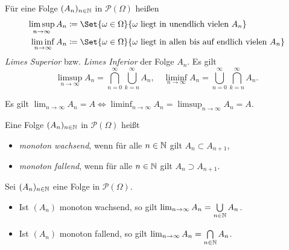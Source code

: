 \documentclass{cheat-sheet}
\newcommand{\PS}{\mathcal{P}} %
\newcommand{\PSO}{\PS(\Omega)} %
\begin{document}
\begin{defn}
  Für eine Folge $(A_n)_{n \in \mathbb{N}}$ in $\PS(\Omega)$ heißen
  \begin{align*}
    \limsup_{n \to \infty} A_n &\coloneqq \Set{ \omega \in \Omega }{ \omega \text{ liegt in unendlich vielen } A_n } \\
    \liminf_{n \to \infty} A_n &\coloneqq \Set{ \omega \in \Omega }{ \omega \text{ liegt in allen bis auf endlich vielen } A_n }
  \end{align*}
  \emph{Limes Superior} bzw. \emph{Limes Inferior} der Folge $A_n$. Es gilt
  \[
    \limsup_{n \to \infty} A_n = \bigcap_{n = 0}^\infty \bigcup_{k = n}^\infty A_n, \quad
    \liminf_{n \to \infty} A_n = \bigcup_{n = 0}^\infty \bigcap_{k = n}^\infty A_n.
  \]
\end{defn}


\begin{satz}
  Es gilt $\lim_{n \to \infty} A_n = A \iff \liminf_{n \to \infty} A_n = \limsup_{n \to \infty} A_n = A$.
\end{satz}

\begin{defn}
  Eine Folge $(A_n)_{n \in \mathbb{N}}$ in $\PSO$ heißt
  \begin{itemize}
    \item \emph{monoton wachsend}, wenn für alle $n \in \mathbb{N}$ gilt $A_n \subset A_{n+1}$,
    \item \emph{monoton fallend}, wenn für alle $n \in \mathbb{N}$ gilt $A_n \supset A_{n+1}$.
  \end{itemize}
\end{defn}

\begin{satz}
  Sei $(A_n)_{n \in \mathbb{N}}$ eine Folge in $\PSO$.
  \begin{itemize}
    \item Ist $(A_n)$ monoton wachsend, so gilt $\lim_{n \to \infty} A_n = \bigcup_{n \in \N} A_n$.
    \item Ist $(A_n)$ monoton fallend, so gilt $\lim_{n \to \infty} A_n = \bigcap_{n \in \N} A_n$.
  \end{itemize}
\end{satz}
\end{document}

